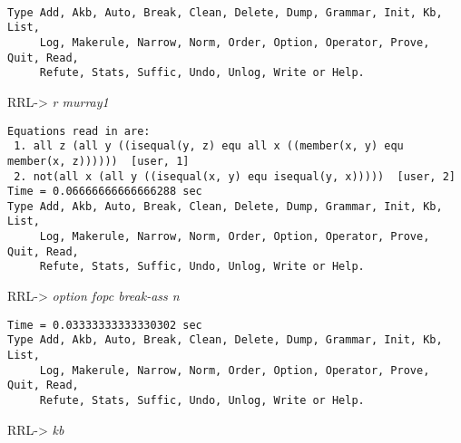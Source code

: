 \scriptsize
\small
\tt
\begin{verbatim}
Type Add, Akb, Auto, Break, Clean, Delete, Dump, Grammar, Init, Kb, List,
     Log, Makerule, Narrow, Norm, Order, Option, Operator, Prove, Quit, Read,
     Refute, Stats, Suffic, Undo, Unlog, Write or Help.
\end{verbatim}
RRL-> {\em r murray1}
\begin{verbatim}
Equations read in are:
 1. all z (all y ((isequal(y, z) equ all x ((member(x, y) equ member(x, z))))))  [user, 1]
 2. not(all x (all y ((isequal(x, y) equ isequal(y, x)))))  [user, 2]
Time = 0.06666666666666288 sec
Type Add, Akb, Auto, Break, Clean, Delete, Dump, Grammar, Init, Kb, List,
     Log, Makerule, Narrow, Norm, Order, Option, Operator, Prove, Quit, Read,
     Refute, Stats, Suffic, Undo, Unlog, Write or Help.
\end{verbatim}
RRL-> {\em option fopc break-ass n}
\begin{verbatim}
Time = 0.03333333333330302 sec
Type Add, Akb, Auto, Break, Clean, Delete, Dump, Grammar, Init, Kb, List,
     Log, Makerule, Narrow, Norm, Order, Option, Operator, Prove, Quit, Read,
     Refute, Stats, Suffic, Undo, Unlog, Write or Help.
\end{verbatim}
RRL-> {\em kb}
